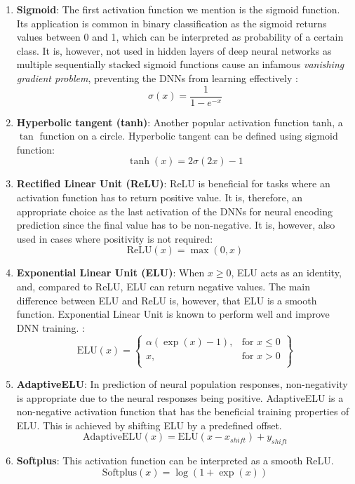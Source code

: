 \begin{enumerate}
	\item \textbf{Sigmoid}: The first activation function we mention is the sigmoid function. Its application is common in binary classification as the sigmoid returns values between 0 and 1, which can be interpreted as probability of a certain class. It is, however, not used in hidden layers of deep neural networks as multiple sequentially stacked sigmoid functions cause an infamous \emph{vanishing gradient problem}, preventing the DNNs from learning effectively \citep{Goodfellow-et-al-2016}:
	\begin{equation}
		\sigma (x) = \frac{1}{1 - e^{-x}}
	\end{equation}
	\item \textbf{Hyperbolic tangent (tanh)}: Another popular activation function tanh, a $\tan$ function on a circle. Hyperbolic tangent can be defined using sigmoid function:
	\begin{equation}
		\tanh (x) = 2 \sigma(2x) - 1
	\end{equation}
	\item \textbf{Rectified Linear Unit (ReLU)}: ReLU is beneficial for tasks where an activation function has to return positive value. It is, therefore, an appropriate choice as the last activation of the DNNs for neural encoding prediction since the final value has to be non-negative. It is, however, also used in cases where positivity is not required:
	\begin{equation}
	\text{ReLU} (x) = \max(0, x)
	\end{equation}
	\item \textbf{Exponential Linear Unit (ELU)}: When $x \geq 0$, ELU acts as an identity, and, compared to ReLU, ELU can return negative values. The main difference between ELU and ReLU is, however, that ELU is a smooth function. Exponential Linear Unit is known to perform well and improve DNN training. \citep{clevert2015fast}:
	\begin{equation}
	\text{ELU} (x) = \left\{\begin{array}{lr}
	\alpha (\exp(x) - 1), & \text{for } x \leq 0 \\
	x, & \text{for } x > 0 \\
	\end{array}\right\}
	\end{equation}
	\item \textbf{AdaptiveELU}: In prediction of neural population responses, non-negativity is appropriate due to the neural responses being positive. AdaptiveELU is a non-negative activation function that has the beneficial training properties of ELU. This is achieved by shifting ELU by a predefined offset.
	\begin{equation}
	\text{AdaptiveELU}(x) = \text{ELU}(x - x_{shift}) + y_{shift}
	\end{equation}
	\item \textbf{Softplus}: This activation function can be interpreted as a smooth ReLU.
	\begin{equation}\label{softplus_equation}
	\text{Softplus} (x) = \log(1 + \exp(x))
	\end{equation}
\end{enumerate}


